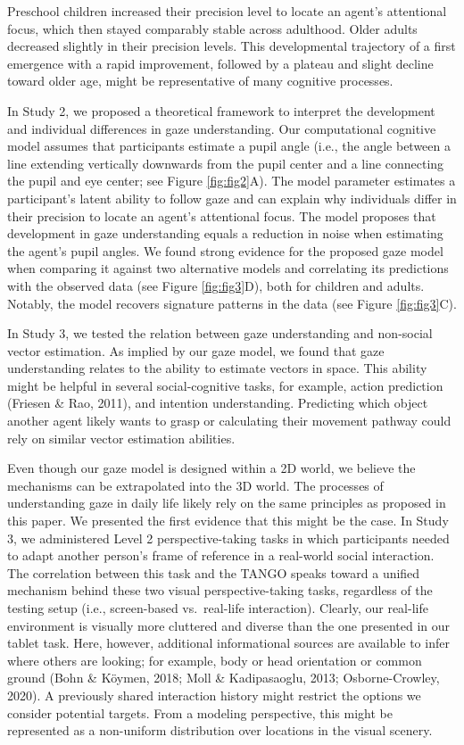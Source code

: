 \documentclass[
  man,mask,floatsintext]{apa7}
\begin{document}
Preschool children increased their precision level to locate an agent's attentional focus, which then stayed comparably stable across adulthood. Older adults decreased slightly in their precision levels. This developmental trajectory of a first emergence with a rapid improvement, followed by a plateau and slight decline toward older age, might be representative of many cognitive processes.

In Study 2, we proposed a theoretical framework to interpret the development and individual differences in gaze understanding. Our computational cognitive model assumes that participants estimate a pupil angle (i.e., the angle between a line extending vertically downwards from the pupil center and a line connecting the pupil and eye center; see Figure \ref{fig:fig2}A). The model parameter estimates a participant's latent ability to follow gaze and can explain why individuals differ in their precision to locate an agent's attentional focus. The model proposes that development in gaze understanding equals a reduction in noise when estimating the agent's pupil angles. We found strong evidence for the proposed gaze model when comparing it against two alternative models and correlating its predictions with the observed data (see Figure \ref{fig:fig3}D), both for children and adults. Notably, the model recovers signature patterns in the data (see Figure \ref{fig:fig3}C).

In Study 3, we tested the relation between gaze understanding and non-social vector estimation. As implied by our gaze model, we found that gaze understanding relates to the ability to estimate vectors in space. This ability might be helpful in several social-cognitive tasks, for example, action prediction (Friesen \& Rao, 2011), and intention understanding. Predicting which object another agent likely wants to grasp or calculating their movement pathway could rely on similar vector estimation abilities.

Even though our gaze model is designed within a 2D world, we believe the mechanisms can be extrapolated into the 3D world. The processes of understanding gaze in daily life likely rely on the same principles as proposed in this paper. We presented the first evidence that this might be the case. In Study 3, we administered Level 2 perspective-taking tasks in which participants needed to adapt another person's frame of reference in a real-world social interaction. The correlation between this task and the TANGO speaks toward a unified mechanism behind these two visual perspective-taking tasks, regardless of the testing setup (i.e., screen-based vs.~real-life interaction). Clearly, our real-life environment is visually more cluttered and diverse than the one presented in our tablet task. Here, however, additional informational sources are available to infer where others are looking; for example, body or head orientation or common ground (Bohn \& Köymen, 2018; Moll \& Kadipasaoglu, 2013; Osborne-Crowley, 2020). A previously shared interaction history might restrict the options we consider potential targets. From a modeling perspective, this might be represented as a non-uniform distribution over locations in the visual scenery.
\end{document}
